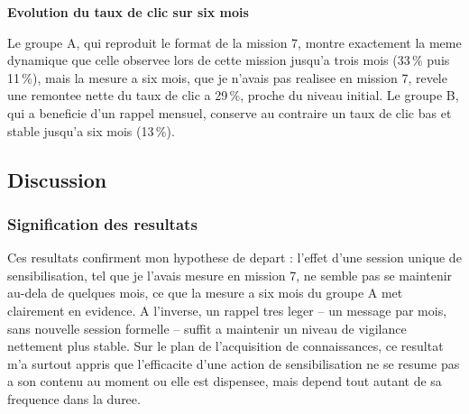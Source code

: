 \documentclass[11pt,a4paper]{article}
\begin{document}
\begin{center}
{\small\bfseries\color{apcblue} Evolution du taux de clic sur six mois}\\[6pt]
\end{center}
\vspace{4pt}

Le groupe A, qui reproduit le format de la mission 7, montre exactement la meme dynamique que celle observee lors de cette mission jusqu'a trois mois (33\,\% puis 11\,\%), mais la mesure a six mois, que je n'avais pas realisee en mission 7, revele une remontee nette du taux de clic a 29\,\%, proche du niveau initial. Le groupe B, qui a beneficie d'un rappel mensuel, conserve au contraire un taux de clic bas et stable jusqu'a six mois (13\,\%).

\subsection{Discussion}

\subsubsection*{Signification des resultats}

Ces resultats confirment mon hypothese de depart : l'effet d'une session unique de sensibilisation, tel que je l'avais mesure en mission 7, ne semble pas se maintenir au-dela de quelques mois, ce que la mesure a six mois du groupe A met clairement en evidence. A l'inverse, un rappel tres leger -- un message par mois, sans nouvelle session formelle -- suffit a maintenir un niveau de vigilance nettement plus stable. Sur le plan de l'acquisition de connaissances, ce resultat m'a surtout appris que l'efficacite d'une action de sensibilisation ne se resume pas a son contenu au moment ou elle est dispensee, mais depend tout autant de sa frequence dans la duree.
\end{document}

